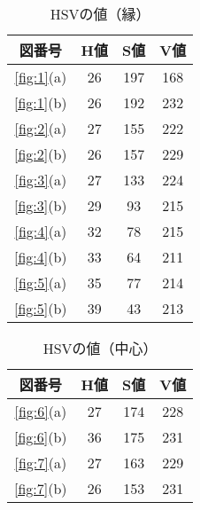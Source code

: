 \documentclass[main]{subfiles}
\begin{document}
\begin{table}[h]
    \caption{HSVの値（縁）}
    \label{table:HSV1}
    \centering
\begin{tabular}{c|c|c|c}
    図番号 & H値 & S値 & V値 \\ \hline
   \ref{fig:1}(a) & 26 & 197 & 168 \\ \hline
   \ref{fig:1}(b) & 26 & 192 & 232 \\ \hline\hline
   \ref{fig:2}(a) & 27 & 155 & 222 \\ \hline
   \ref{fig:2}(b) & 26 & 157 & 229 \\ \hline
   \ref{fig:3}(a) & 27 & 133 & 224 \\ \hline
   \ref{fig:3}(b) & 29 & 93 & 215 \\ \hline\hline
   \ref{fig:4}(a) & 32 & 78 & 215 \\ \hline
   \ref{fig:4}(b) & 33 & 64 & 211 \\ \hline
   \ref{fig:5}(a) & 35 & 77 & 214 \\ \hline
   \ref{fig:5}(b) & 39 & 43 & 213 \\
\end{tabular}    
\end{table}

\begin{table}[h]
    \caption{HSVの値（中心）}
    \label{table:RGB2}
    \centering
\begin{tabular}{c|c|c|c}
    図番号 & H値 & S値 & V値 \\ \hline
   \ref{fig:6}(a) & 27 & 174 & 228 \\ \hline
   \ref{fig:6}(b) & 36 & 175 & 231 \\ \hline\hline
   \ref{fig:7}(a) & 27 & 163 & 229 \\ \hline
   \ref{fig:7}(b) & 26 & 153 & 231 \\ 
\end{tabular}    
\end{table}
\end{document}
